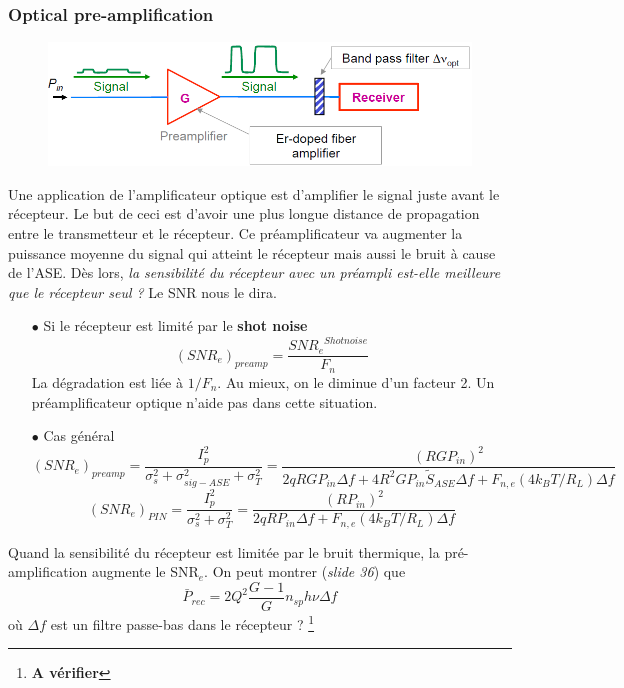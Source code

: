 \subsubsection{Optical pre-amplification}
	\begin{figure}
	\vspace{-9mm}
	\includegraphics[scale=0.4]{ch6/image13}
	\end{figure}
Une application de l'amplificateur optique est d'amplifier le signal juste avant le récepteur. Le but de ceci
est d'avoir une plus longue distance de propagation entre le transmetteur et le récepteur. Ce préamplificateur
va augmenter la puissance moyenne du signal qui atteint le récepteur mais aussi le bruit à cause de l'ASE. Dès
lors, \textit{la sensibilité du récepteur avec un préampli est-elle meilleure que le récepteur seul ?} Le 
SNR nous le dira.\\

\begin{itemize}
\item[$\bullet$] Si le récepteur est limité par le \textbf{shot noise}\\
\begin{equation}
{(SN{R_e})_{preamp}} = \frac{{SN{R_e}^{Shotnoise}}}{{{F_n}}}
\end{equation}
La dégradation est liée à $1/F_n$. Au mieux, on le diminue d'un facteur 2. Un préamplificateur optique n'aide pas
dans cette situation.

\item[$\bullet$] Cas général
\begin{equation}
{(SN{R_e})_{preamp}} = \frac{{I_p^2}}{{\sigma _s^2 + \sigma _{sig - ASE}^2 + \sigma _T^2}} = \frac{{{{(RG{P_{in}})}^2}}}{{2qRG{P_{in}}\Delta f + 4{R^2}G{P_{in}}{{\tilde S}_{ASE}}\Delta f + {F_{n,e}}(4{k_B}T/{R_L})\Delta f}}
\end{equation}
\begin{equation}
{(SN{R_e})_{PIN}} = \frac{{I_p^2}}{{\sigma _s^2 + \sigma _T^2}} = \frac{{{{(R{P_{in}})}^2}}}{{2qR{P_{in}}\Delta f + {F_{n,e}}(4{k_B}T/{R_L})\Delta f}}
\end{equation}
\end{itemize}
\newpage
Quand la sensibilité du récepteur est limitée par le bruit thermique, la pré-amplification augmente le SNR$_e$.
On peut montrer (\textit{slide 36}) que
\begin{equation}
{\bar P_{rec}} = 2{Q^2}\frac{{G - 1}}{G}{n_{sp}}h\nu \Delta f
\end{equation}
où $\Delta f$ est un filtre passe-bas dans le  récepteur ? \footnote{\textbf{A vérifier}}

